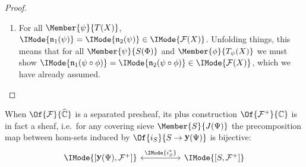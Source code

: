 \documentclass{article}
\DeclareMathOperator\OpYoneda{\mathbf{y}}
\newcommand\Yoneda[1]{\OpYoneda({#1})}
\newcommand\Psh[1]{\widehat{#1}}
\newcommand\Plus[1]{{#1}^+}
\newcommand\IsEqIn[3]{\IMode{#1}=\IMode{#2}\in\IMode{#3}}
\begin{document}
\begin{proof}
\begin{enumerate}
  \item For all $\Member{\psi}{T(X)}$,
    $\IsEqIn{\mathfrak{n}_1(\psi)}{\mathfrak{n}_2(\psi)}{\mathcal{F}(X)}$. Unfolding
    things, this means that for all $\Member{\psi}{S(\Phi)}$ and
    $\Member{\phi}{T_\psi(X)}$ we must show
    $\IsEqIn{\mathfrak{n}_1(\psi\circ\phi)}{\mathfrak{n}_2(\psi\circ\phi)}{\mathcal{F}(X)}$,
    which we have already assumed.
  \end{enumerate}

\end{proof}


\begin{thm}\label{thm:plus-sheaf}
  When $\Of{\mathcal{F}}{\Psh{\mathbb{C}}}$ is a separated presheaf, its plus
  construction $\Of{\Plus{\mathcal{F}}}{\mathbb{C}}$ is in fact a sheaf, i.e.\
  for any covering sieve $\Member{S}{J(\Psi)}$ the precomposition map
  between hom-sets induced by $\Of{i_S}{S\to\Yoneda{\Psi}}$ is
  bijective:
  \[
    \begin{tikzcd}[sep=huge]
      \IMode{[\Yoneda{\Psi},\Plus{\mathcal{F}}]}
      \arrow[r,leftrightarrow,"\IMode{i_S^*}"]
      &
      \IMode{[S,\Plus{\mathcal{F}}]}
    \end{tikzcd}
  \]
\end{thm}
\end{document}
